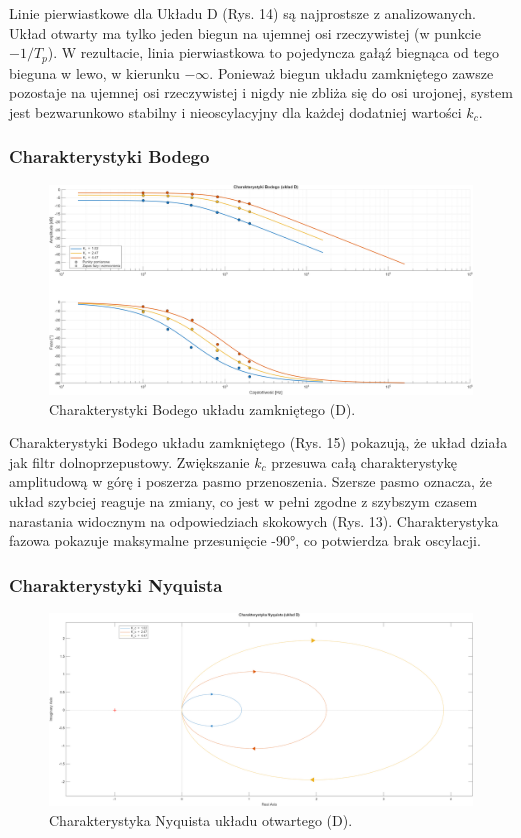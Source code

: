 \documentclass[12pt,a4paper]{article}
\begin{document}
	Linie pierwiastkowe dla Układu D (Rys. 14) są najprostsze z analizowanych. Układ otwarty ma tylko jeden biegun na ujemnej osi rzeczywistej (w punkcie $-1/T_p$). W rezultacie, linia pierwiastkowa to pojedyncza gałąź biegnąca od tego bieguna w lewo, w kierunku $-\infty$. Ponieważ biegun układu zamkniętego zawsze pozostaje na ujemnej osi rzeczywistej i nigdy nie zbliża się do osi urojonej, system jest bezwarunkowo stabilny i nieoscylacyjny dla każdej dodatniej wartości $k_c$.
	
	\subsubsection{Charakterystyki Bodego}
	
	\begin{figure}[H]
		\centering
		\includegraphics[width=1\linewidth]{zdjecia/Bode_ukladD.png}
		\caption{Charakterystyki Bodego układu zamkniętego (D).}
		\label{fig:Bode_ukladD}
	\end{figure}
	
	Charakterystyki Bodego układu zamkniętego (Rys. 15) pokazują, że układ działa jak filtr dolnoprzepustowy. Zwiększanie $k_c$ przesuwa całą charakterystykę amplitudową w górę i poszerza pasmo przenoszenia. Szersze pasmo oznacza, że układ szybciej reaguje na zmiany, co jest w pełni zgodne z szybszym czasem narastania widocznym na odpowiedziach skokowych (Rys. 13). Charakterystyka fazowa pokazuje maksymalne przesunięcie -90°, co potwierdza brak oscylacji.
	
	\subsubsection{Charakterystyki Nyquista}
	
	\begin{figure}[H]
		\centering
		\includegraphics[width=0.8\linewidth]{zdjecia/NQ_ukladD.png}
		\caption{Charakterystyka Nyquista układu otwartego (D).}
		\label{fig:NQ_ukladD}
	\end{figure}
	
\end{document}
